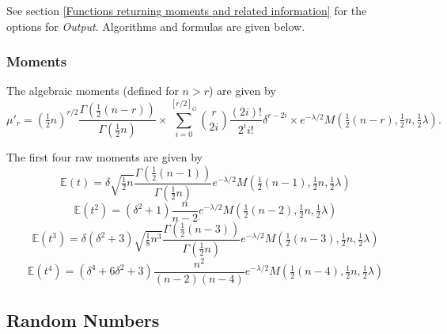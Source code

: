 \vspace{0.3cm}

See section \ref{Functions returning moments and related information} for the options for {\itshape\sffamily Output}. Algorithms and formulas are given below.



\subsubsection{Moments}
\label{DoublyNoncentralTMoments}
The algebraic moments (defined for $n>r$) are given by
\begin{equation}
	\mu'_r = \left({\tfrac{1}{2}n}\right)^{r/2} \frac{\Gamma\left(\tfrac{1}{2}(n-r)\right)}{\Gamma\left(\tfrac{1}{2}n\right)}  \times  \sum_{i=0}^{[r/2]_G} { \binom{r}{2i} \frac{(2i)!} {2^i i!}} \delta^{r-2i}  \times  e^{-\lambda/2} M\left(\tfrac{1}{2}(n-r),\tfrac{1}{2}n,\tfrac{1}{2}\lambda\right).
\end{equation}

The first four raw moments are given by
\begin{equation}
	\mathbb{E}(t)=\delta \sqrt{\tfrac{1}{2}n} \frac{\Gamma\left(\tfrac{1}{2}(n-1)\right)}{\Gamma\left(\tfrac{1}{2}n\right)}  e^{-\lambda/2} M\left(\tfrac{1}{2}(n-1),\tfrac{1}{2}n,\tfrac{1}{2}\lambda\right)
\end{equation}
\begin{equation}
	\mathbb{E}(t^2)= (\delta^2+1) \frac{n}{n-2}  e^{-\lambda/2} M\left(\tfrac{1}{2}(n-2),\tfrac{1}{2}n,\tfrac{1}{2}\lambda\right)
\end{equation}
\begin{equation}
	\mathbb{E}(t^3)=\delta(\delta^2+3) \sqrt{\tfrac{1}{8}n^3} \frac{\Gamma\left(\tfrac{1}{2}(n-3)\right)}{\Gamma\left(\tfrac{1}{2}n\right)}  e^{-\lambda/2} M\left(\tfrac{1}{2}(n-3),\tfrac{1}{2}n,\tfrac{1}{2}\lambda\right)
\end{equation}
\begin{equation}
	\mathbb{E}(t^4)= (\delta^4+ 6\delta^2+3) \frac{n^2}{(n-2)(n-4)}  e^{-\lambda/2} M\left(\tfrac{1}{2}(n-4),\tfrac{1}{2}n,\tfrac{1}{2}\lambda\right)
\end{equation}




\subsection{Random Numbers}
\label{DoublyNoncentraltDistributionRandom}

